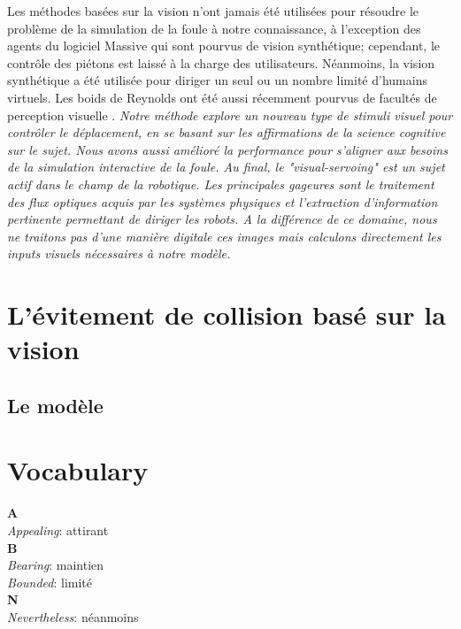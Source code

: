 \documentclass[11pt]{article}
\begin{document}
Les méthodes basées sur la vision n'ont jamais été utilisées pour résoudre le problème de la simulation de la foule à notre connaissance, à l'exception des agents du logiciel Massive qui sont pourvus de vision synthétique; cependant, le contrôle des piétons est laissé à la charge des utilisateurs. Néanmoins, la vision synthétique a été utilisée pour diriger un seul ou un nombre limité d'humains virtuels. Les boids de Reynolds ont été aussi récemment pourvus de facultés de perception visuelle \cite{silva-09}. \textit{Notre méthode explore un nouveau type de stimuli visuel pour contrôler le déplacement, en se basant sur les affirmations de la science cognitive sur le sujet. Nous avons aussi amélioré la performance pour s'aligner aux besoins de la simulation interactive de la foule. Au final, le "visual-servoing" est un sujet actif dans le champ de la robotique\cite{chaumette-06}. Les principales gageures sont le traitement des flux optiques acquis par les systèmes physiques et l'extraction d'information pertinente permettant de diriger les robots. A la différence de ce domaine, nous ne traitons pas d'une manière digitale ces images mais calculons directement les inputs visuels nécessaires à notre modèle.}

\section{L'évitement de collision basé sur la vision}

\subsection*{Le modèle}



\section{Vocabulary}

\noindent \textbf{A}\\
\textit{Appealing}: attirant \\
\textbf{B}\\
\textit{Bearing}: maintien \\
\textit{Bounded}: limité \\
\textbf{N}\\
\textit{Nevertheless}: néanmoins \\
\end{document}
